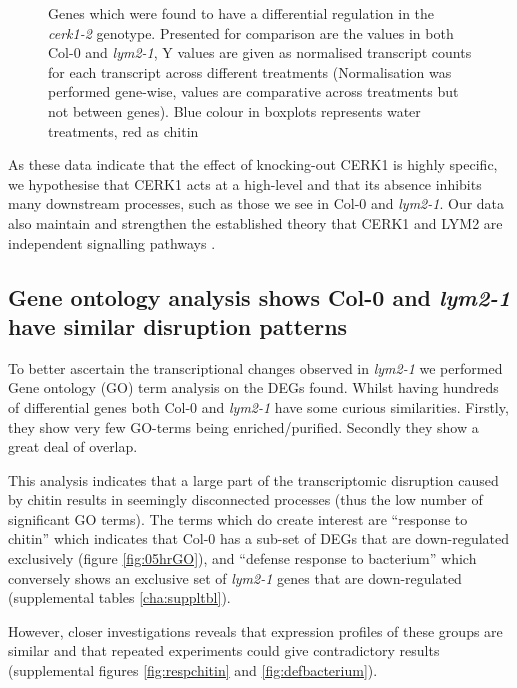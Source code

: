 \documentclass[../main.tex]{subfiles}
\begin{document}
\begin{figure}[!ht]
  \caption{Genes which were found to have a differential regulation in the
    \textit{cerk1-2} genotype. Presented for comparison are the values in both
    Col-0 and \textit{lym2-1}, Y values are given as normalised transcript counts
    for each transcript across different treatments (Normalisation was performed
    gene-wise, values are comparative across treatments but not between genes).
    Blue colour in boxplots represents water treatments, red as chitin }
  \label{fig:cerk}
\end{figure}

As these data indicate that the effect of knocking-out CERK1 is highly specific,
we hypothesise that CERK1 acts at a high-level and that its absence
inhibits many downstream processes, such as those we see in Col-0 and \textit{lym2-1}.
Our data also maintain and strengthen the established theory that CERK1 and LYM2 are
independent signalling pathways \cite{Faulkner2013, miyaCERK1LysMReceptor2007,
  narusakaPresenceLYM2Dependent2013}.



\subsection{Gene ontology analysis shows Col-0 and \textit{lym2-1} have similar
  disruption patterns}

To better ascertain the transcriptional changes observed in \textit{lym2-1} we
performed Gene ontology (GO) term analysis on the DEGs found. Whilst having
hundreds of differential genes both Col-0 and \textit{lym2-1} have some curious
similarities. Firstly, they show very few GO-terms being enriched/purified.
Secondly they show a great deal of overlap.

This analysis indicates that a large part of the transcriptomic disruption
caused by chitin results in seemingly disconnected processes (thus the low
number of significant GO terms). The terms which do create interest are
``response to chitin'' which indicates that Col-0 has a sub-set of DEGs that are
down-regulated exclusively (figure \ref{fig:05hrGO}), and ``defense response to bacterium''
which conversely shows an exclusive set of \textit{lym2-1} genes that are
down-regulated (supplemental
tables \ref{cha:suppltbl}).

However, closer investigations reveals that expression profiles of these groups
are similar and that repeated experiments could give contradictory results
(supplemental figures \ref{fig:respchitin} and \ref{fig:defbacterium}).
\end{document}
